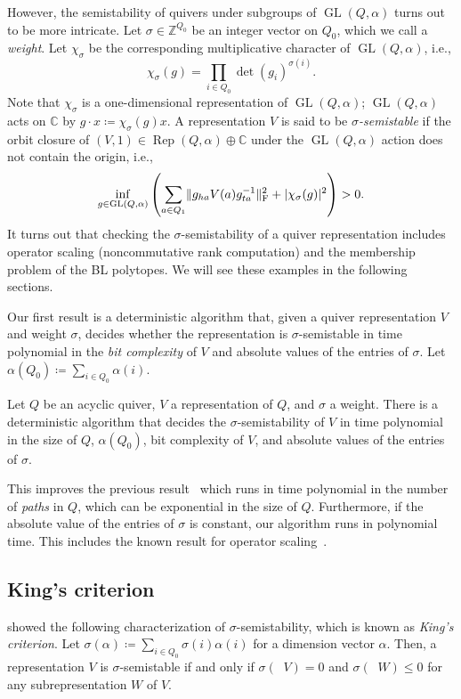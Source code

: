\documentclass[a4paper,11pt]{article}
\numberwithin{equation}{section}
\newcommand{\C}{\mathbb{C}}
\newcommand{\Z}{\mathbb{Z}}
\DeclareMathOperator{\GL}{GL}
\DeclareMathOperator{\Rep}{Rep}
\DeclareMathOperator{\dimv}{\underline{dim}}
\DeclarePairedDelimiter{\norm}{\lVert}{\rVert}
\DeclarePairedDelimiter{\abs}{\lvert}{\rvert}
\begin{document}
However, the semistability of quivers under subgroups of $\GL(Q, \alpha)$ turns out to be more intricate.
Let $\sigma \in \Z^{Q_0}$ be an integer vector on $Q_0$, which we call a \emph{weight}.
Let $\chi_\sigma$ be the corresponding multiplicative character of $\GL(Q, \alpha)$, i.e.,
\[
    \chi_\sigma(g) = \prod_{i \in Q_0} \det(g_{i})^{\sigma(i)}.   
\]
Note that $\chi_\sigma$ is a one-dimensional representation of $\GL(Q, \alpha)$; $\GL(Q, \alpha)$ acts on $\C$ by $g \cdot x \coloneqq \chi_\sigma(g) x$.
A representation $V$ is said to be \emph{$\sigma$-semistable} if the orbit closure of $(V, 1) \in \Rep(Q, \alpha) \oplus \C$ under the $\GL(Q, \alpha)$ action does not contain the origin, i.e.,
\begin{align}
    \inf_{g \in \GL(Q, \alpha)} \left(\sum_{a \in Q_1} \norm{g_{ha} V(a) g_{ta}^{-1}}_{\mathrm{F}}^2 + \abs{\chi_\sigma(g)}^2 \right) > 0.
\end{align}
It turns out that checking the $\sigma$-semistability of a quiver representation includes operator scaling (noncommutative rank computation) and the membership problem of the BL polytopes.
We will see these examples in the following sections.

Our first result is a deterministic algorithm that, given a quiver representation $V$ and weight $\sigma$, decides whether the representation is $\sigma$-semistable in time polynomial in the \emph{bit complexity} of $V$ and absolute values of the entries of $\sigma$.
Let $\alpha(Q_0) \coloneqq \sum_{i \in Q_0} \alpha(i)$.

\begin{theorem}
    Let $Q$ be an acyclic quiver, $V$ a representation of $Q$, and $\sigma$ a weight.
    There is a deterministic algorithm that decides the $\sigma$-semistability of $V$ in time polynomial in the size of $Q$, $\alpha(Q_0)$, bit complexity of $V$, and absolute values of the entries of $\sigma$.
\end{theorem}

This improves the previous result~\cite{Huszar2021} which runs in time polynomial in the number of \emph{paths} in $Q$, which can be exponential in the size of $Q$.
Furthermore, if the absolute value of the entries of $\sigma$ is constant, our algorithm runs in polynomial time.
This includes the known result for operator scaling~\cite{Garg2019}.

\subsection{King's criterion}
\citet{King1994} showed the following characterization of $\sigma$-semistability, which is known as \emph{King's criterion}.
Let $\sigma(\alpha) \coloneqq \sum_{i \in Q_0} \sigma(i) \alpha(i)$ for a dimension vector $\alpha$.
Then, a representation $V$ is $\sigma$-semistable if and only if $\sigma(\dimv V) = 0$ and  $\sigma(\dimv W) \leq 0$ for any subrepresentation $W$ of $V$.
\end{document}
